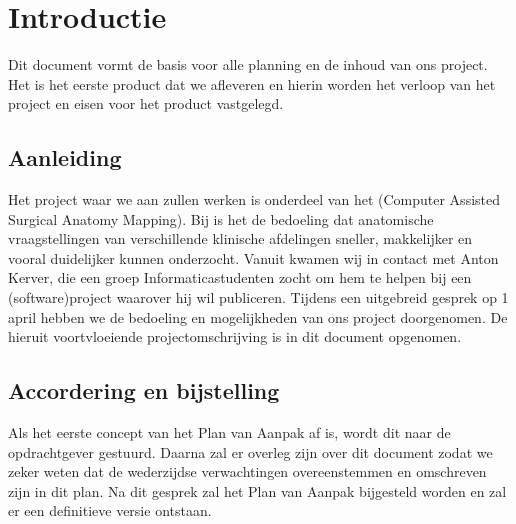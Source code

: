 \section{Introductie}


Dit document vormt de basis voor alle planning en de inhoud van ons project.
Het is het eerste product dat we afleveren en hierin worden het verloop van het project en eisen voor het product vastgelegd.

\subsection{Aanleiding}


Het project waar we aan zullen werken is onderdeel van het \casamproject (Computer Assisted Surgical Anatomy Mapping). 
Bij \casam is het de bedoeling dat anatomische vraagstellingen van verschillende klinische afdelingen sneller, makkelijker en vooral duidelijker kunnen onderzocht.
Vanuit \casam kwamen wij in contact met Anton Kerver, die een groep Informaticastudenten zocht om hem te helpen bij een (software)project waarover hij wil publiceren.
Tijdens een uitgebreid gesprek op 1 april hebben we de bedoeling en mogelijkheden van ons project doorgenomen.
De hieruit voortvloeiende projectomschrijving is in dit document opgenomen.

\subsection{Accordering en bijstelling}


Als het eerste concept van het Plan van Aanpak af is, wordt dit naar de opdrachtgever gestuurd.
Daarna zal er overleg zijn over dit document zodat we zeker weten dat de wederzijdse verwachtingen overeenstemmen en omschreven zijn in dit plan.
Na dit gesprek zal het Plan van Aanpak bijgesteld worden en zal er een definitieve versie ontstaan.

